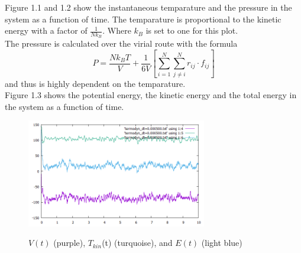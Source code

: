 \documentclass[12pt,a4paper]{article}	%
\begin{document}
\newpage



\newpage 

Figure 1.1 and 1.2 show the instantaneous temparature and the pressure in the system as a function of time. The temparature is proportional to the kinetic energy with a factor of $\frac{1}{Nk_B}$. Where $k_B$ is set to one for this plot. \\

The pressure is calculated over the virial route with the formula 
\begin{equation}
P = \frac{Nk_BT}{V} + \frac{1}{6V} \left[ \sum\limits_{i=1}^N  \sum\limits_{j \neq i}^N r_{ij} \cdot f_{ij}\right]
\end{equation}
and thus is highly dependent on the temparature. \\


Figure 1.3 shows the potential energy, the kinetic energy and the total energy in the system as a function of time. 

\begin{figure}[h!]	
\centering
{\includegraphics[width=0.7\textwidth]{VTE(t).png}}		
\caption{$V(t)$ (purple), $T_{kin}$(t) (turquoise), and $E(t)$ (light blue)}
\end{figure}


%
%



\end{document}
